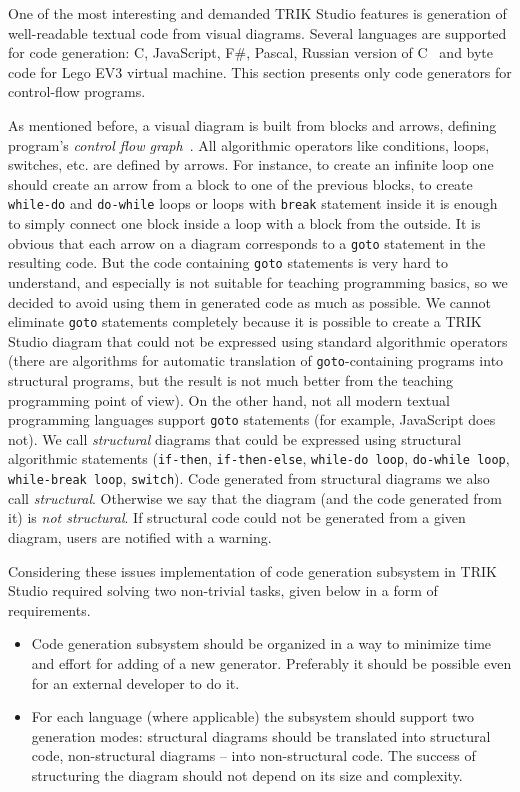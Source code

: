 \documentclass[conference]{IEEEtran}
\begin{document}
One of the most interesting and demanded TRIK Studio features is generation of well-readable textual code from visual diagrams. Several languages are supported for code generation: C, JavaScript, F\#, Pascal, Russian version of C~\cite{тереховотечественные} and byte code for Lego EV3 virtual machine. This section presents only code generators for control-flow programs.

As mentioned before, a visual diagram is built from blocks and arrows, defining program's \textit{control flow graph}~\cite{steven1997advanced}. All algorithmic operators like conditions, loops, switches, etc. are defined by arrows. For instance, to create an infinite loop one should create an arrow from a block to one of the previous blocks, to create \texttt{while-do} and \texttt{do-while} loops or loops with \texttt{break} statement inside it is enough to simply connect one block inside a loop with a block from the outside. It is obvious that each arrow on a diagram corresponds to a \texttt{goto} statement in the resulting code. But the code containing \texttt{goto} statements is very hard to understand, and especially is not suitable for teaching programming basics, so we decided to avoid using them in generated code as much as possible. We cannot eliminate \texttt{goto} statements completely because it is possible to create a TRIK Studio diagram that could not be expressed using standard algorithmic operators (there are algorithms for automatic translation of \texttt{goto}-containing programs into structural programs, but the result is not much better from the teaching programming point of view). On the other hand, not all modern textual programming languages support \texttt{goto} statements (for example, JavaScript does not). We call \textit{structural} diagrams that could be expressed using structural algorithmic statements (\texttt{if-then}, \texttt{if-then-else}, \texttt{while-do loop}, \texttt{do-while loop}, \texttt{while-break loop}, \texttt{switch}). Code generated from structural diagrams we also call \textit{structural}. Otherwise we say that the diagram (and the code generated from it) is \textit{not structural}. If structural code could not be generated from a given diagram, users are notified with a warning.

Considering these issues implementation of code generation subsystem in TRIK Studio required solving two non-trivial tasks, given below in a form of requirements.
 
\begin{itemize}
    \item Code generation subsystem should be organized in a way to minimize time and effort for adding of a new generator. Preferably it should be possible even for an external developer to do it.
    \item For each language (where applicable) the subsystem should support two generation modes: structural diagrams should be translated into structural code, non-structural diagrams -- into non-structural code. The success of structuring the diagram should not depend on its size and complexity.
\end{itemize}
\end{document}
